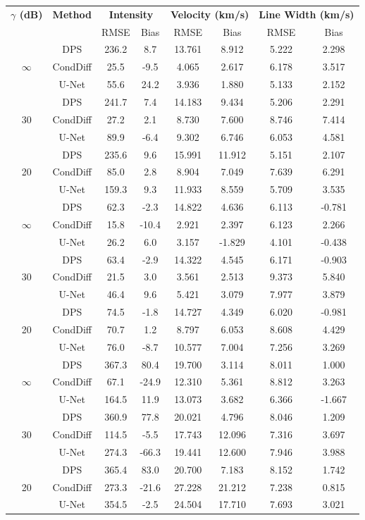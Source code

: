 \begin{tabular}{c c c c c c c c}
\hline
\textbf{$\gamma$ (dB)} & \textbf{Method} & \multicolumn{2}{c}{\textbf{Intensity}} & \multicolumn{2}{c}{\textbf{Velocity (km/s)}} & \multicolumn{2}{c}{\textbf{Line Width (km/s)}} \\
 & & RMSE & Bias & RMSE & Bias & RMSE & Bias \\
\hline
\multirow{3}{*}{$\infty$} & DPS & 236.2 & 8.7 & 13.761 & 8.912 & 5.222 & 2.298 \\
 & CondDiff & 25.5 & -9.5 & 4.065 & 2.617 & 6.178 & 3.517 \\
 & U-Net & 55.6 & 24.2 & 3.936 & 1.880 & 5.133 & 2.152 \\
\hline
\multirow{3}{*}{30} & DPS & 241.7 & 7.4 & 14.183 & 9.434 & 5.206 & 2.291 \\
 & CondDiff & 27.2 & 2.1 & 8.730 & 7.600 & 8.746 & 7.414 \\
 & U-Net & 89.9 & -6.4 & 9.302 & 6.746 & 6.053 & 4.581 \\
\hline
\multirow{3}{*}{20} & DPS & 235.6 & 9.6 & 15.991 & 11.912 & 5.151 & 2.107 \\
 & CondDiff & 85.0 & 2.8 & 8.904 & 7.049 & 7.639 & 6.291 \\
 & U-Net & 159.3 & 9.3 & 11.933 & 8.559 & 5.709 & 3.535 \\
\hline
\multirow{3}{*}{$\infty$} & DPS & 62.3 & -2.3 & 14.822 & 4.636 & 6.113 & -0.781 \\
 & CondDiff & 15.8 & -10.4 & 2.921 & 2.397 & 6.123 & 2.266 \\
 & U-Net & 26.2 & 6.0 & 3.157 & -1.829 & 4.101 & -0.438 \\
\hline
\multirow{3}{*}{30} & DPS & 63.4 & -2.9 & 14.322 & 4.545 & 6.171 & -0.903 \\
 & CondDiff & 21.5 & 3.0 & 3.561 & 2.513 & 9.373 & 5.840 \\
 & U-Net & 46.4 & 9.6 & 5.421 & 3.079 & 7.977 & 3.879 \\
\hline
\multirow{3}{*}{20} & DPS & 74.5 & -1.8 & 14.727 & 4.349 & 6.020 & -0.981 \\
 & CondDiff & 70.7 & 1.2 & 8.797 & 6.053 & 8.608 & 4.429 \\
 & U-Net & 76.0 & -8.7 & 10.577 & 7.004 & 7.256 & 3.269 \\
\hline
\multirow{3}{*}{$\infty$} & DPS & 367.3 & 80.4 & 19.700 & 3.114 & 8.011 & 1.000 \\
 & CondDiff & 67.1 & -24.9 & 12.310 & 5.361 & 8.812 & 3.263 \\
 & U-Net & 164.5 & 11.9 & 13.073 & 3.682 & 6.366 & -1.667 \\
\hline
\multirow{3}{*}{30} & DPS & 360.9 & 77.8 & 20.021 & 4.796 & 8.046 & 1.209 \\
 & CondDiff & 114.5 & -5.5 & 17.743 & 12.096 & 7.316 & 3.697 \\
 & U-Net & 274.3 & -66.3 & 19.441 & 12.600 & 7.946 & 3.988 \\
\hline
\multirow{3}{*}{20} & DPS & 365.4 & 83.0 & 20.700 & 7.183 & 8.152 & 1.742 \\
 & CondDiff & 273.3 & -21.6 & 27.228 & 21.212 & 7.238 & 0.815 \\
 & U-Net & 354.5 & -2.5 & 24.504 & 17.710 & 7.693 & 3.021 \\
\hline
\end{tabular}